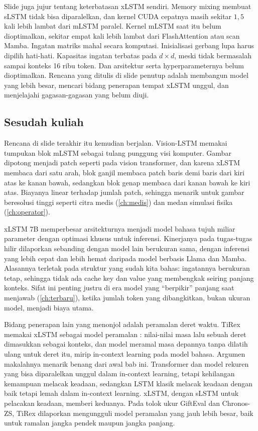 Slide juga jujur tentang keterbatasan xLSTM sendiri. Memory mixing membuat sLSTM tidak bisa diparalelkan, dan kernel CUDA
cepatnya masih sekitar $1{,}5$ kali lebih lambat dari mLSTM paralel. Kernel mLSTM saat itu belum dioptimalkan, sekitar
empat kali lebih lambat dari FlashAttention atau scan Mamba. Ingatan matriks mahal secara komputasi. Inisialisasi gerbang
lupa harus dipilih hati-hati. Kapasitas ingatan terbatas pada $d\times d$, meski tidak bermasalah sampai konteks 16 ribu
token. Dan arsitektur serta hyperparameternya belum dioptimalkan. Rencana yang ditulis di slide penutup adalah membangun
model yang lebih besar, mencari bidang penerapan tempat xLSTM unggul, dan menjelajahi gagasan-gagasan yang belum diuji.

\subsection{Sesudah kuliah}

Rencana di slide terakhir itu kemudian berjalan. Vision-LSTM \citep{alkin2024vil} memakai tumpukan blok mLSTM sebagai
tulang punggung visi komputer. Gambar dipotong menjadi patch seperti pada vision transformer, dan karena xLSTM membaca
dari satu arah, blok ganjil membaca patch baris demi baris dari kiri atas ke kanan bawah, sedangkan blok genap membaca
dari kanan bawah ke kiri atas. Biayanya linear terhadap jumlah patch, sehingga menarik untuk gambar beresolusi tinggi
seperti citra medis (\cref{ch:medis}) dan medan simulasi fisika (\cref{ch:operator}).

xLSTM 7B \citep{beck2025xlstm7b} memperbesar arsitekturnya menjadi model bahasa tujuh miliar parameter dengan optimasi
khusus untuk inferensi. Kinerjanya pada tugas-tugas hilir dilaporkan sebanding dengan model lain berukuran sama, dengan
inferensi yang lebih cepat dan lebih hemat daripada model berbasis Llama dan Mamba. Alasannya terletak pada struktur
yang sudah kita bahas: ingatannya berukuran tetap, sehingga tidak ada cache key dan value yang membengkak seiring
panjang konteks. Sifat ini penting justru di era model yang ``berpikir'' panjang saat menjawab (\cref{ch:terbaru}),
ketika jumlah token yang dibangkitkan, bukan ukuran model, menjadi biaya utama.

Bidang penerapan lain yang menonjol adalah peramalan deret waktu. TiRex \citep{auer2025tirex} memakai xLSTM sebagai model
peramalan : nilai-nilai masa lalu sebuah deret dimasukkan sebagai konteks, dan model meramal masa
depannya tanpa dilatih ulang untuk deret itu, mirip in-context learning pada model bahasa. Argumen makalahnya menarik
benang dari awal bab ini. Transformer dan model rekuren yang bisa diparalelkan unggul dalam in-context learning, tetapi
kehilangan kemampuan melacak keadaan, sedangkan LSTM klasik melacak keadaan dengan baik tetapi lemah dalam in-context
learning. xLSTM, dengan sLSTM untuk pelacakan keadaan, memberi keduanya. Pada tolok ukur GiftEval dan Chronos-ZS, TiRex
dilaporkan mengungguli model peramalan yang jauh lebih besar, baik untuk ramalan jangka pendek maupun jangka panjang.

